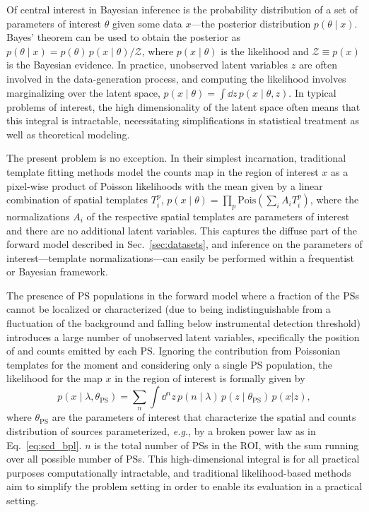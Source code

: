 \documentclass[prd,aps,10pt,nofootinbib,twocolumn,superscriptaddress,preprintnumbers,balancelastpage,longbibliography]{revtex4-1}
\begin{document}
Of central interest in Bayesian inference is the probability distribution of a set of parameters of interest $\theta$ given some data $x$---the posterior distribution $p(\theta\mid x)$. Bayes' theorem can be used to obtain the posterior as $p(\theta\mid x) = p(\theta)\, p(x\mid\theta) / \mathcal Z$, where $p(x\mid\theta)$ is the likelihood and $\mathcal Z \equiv p(x)$ is the Bayesian evidence. In practice, unobserved latent variables $z$ are often involved in the data-generation process, and computing the likelihood involves marginalizing over the latent space, $p(x\mid\theta) = \int \dd z\,p(x\mid\theta, z)$. In typical problems of interest, the high dimensionality of the latent space often means that this integral is intractable, necessitating simplifications in statistical treatment as well as theoretical modeling. 

The present problem is no exception. In their simplest incarnation, traditional template fitting methods model the counts map in the region of interest $x$ as a pixel-wise product of Poisson likelihoods with the mean given by a linear combination of spatial templates $T_i^p$, $p(x\mid \theta) = \prod_p \mathrm{Pois}\left(\sum_i A_i T_i^p\right)$, where the normalizations $A_i$ of the respective spatial templates are parameters of interest and there are no additional latent variables. This captures the diffuse part of the forward model described in Sec.~\ref{sec:datasets}, and inference on the parameters of interest---template normalizations---can easily be performed within a frequentist or Bayesian framework. 

The presence of PS populations in the forward model where a fraction of the PSs cannot be localized or characterized (due to being indistinguishable from a fluctuation of the background and falling below instrumental detection threshold) introduces a large number of unobserved latent variables, specifically the position of and counts emitted by each PS. Ignoring the contribution from Poissonian templates for the moment and considering only a single PS population, the likelihood for the map $x$ in the region of interest is formally given by
\begin{equation}
\label{eq:data_likelihood}
p(x\mid\lambda, \theta_\mathrm{PS}) = \sum_{n} \int \dd^{n} z \, p\left(n\mid\lambda\right)\,p(z\mid\theta_\mathrm{PS})\,p(x|z),
\end{equation}
where $\theta_\mathrm{PS}$ are the parameters of interest that characterize the spatial and counts distribution of sources parameterized, \emph{e.g.}, by a broken power law as in Eq.~\eqref{eq:scd_bpl}. $n$ is the total number of PSs in the ROI, with the sum running over all possible number of PSs. This high-dimensional integral is for all practical purposes computationally intractable, and traditional likelihood-based methods aim to simplify the problem setting in order to enable its evaluation in a practical setting.
\end{document}
